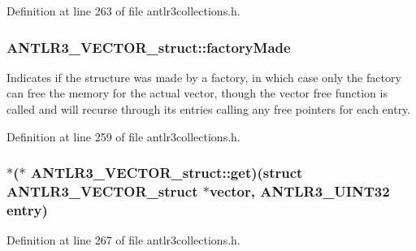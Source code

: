 Definition at line 263 of file antlr3collections.\-h.

\hypertarget{struct_a_n_t_l_r3___v_e_c_t_o_r__struct_a7dabfe6d9965de22b4c2a8ab57c4bdde}{
\subsubsection[{factory\-Made}]{ A\-N\-T\-L\-R3\-\_\-\-V\-E\-C\-T\-O\-R\-\_\-struct\-::factory\-Made}}\label{struct_a_n_t_l_r3___v_e_c_t_o_r__struct_a7dabfe6d9965de22b4c2a8ab57c4bdde}
Indicates if the structure was made by a factory, in which case only the factory can free the memory for the actual vector, though the vector free function is called and will recurse through its entries calling any free pointers for each entry. 

Definition at line 259 of file antlr3collections.\-h.

\hypertarget{struct_a_n_t_l_r3___v_e_c_t_o_r__struct_a784acc56b2e82f3076691f7b1b28e279}{
\subsubsection[{get}]{$\ast$($\ast$ A\-N\-T\-L\-R3\-\_\-\-V\-E\-C\-T\-O\-R\-\_\-struct\-::get)(struct {\bf A\-N\-T\-L\-R3\-\_\-\-V\-E\-C\-T\-O\-R\-\_\-struct} $\ast${\bf vector}, {\bf A\-N\-T\-L\-R3\-\_\-\-U\-I\-N\-T32} entry)}}\label{struct_a_n_t_l_r3___v_e_c_t_o_r__struct_a784acc56b2e82f3076691f7b1b28e279}


Definition at line 267 of file antlr3collections.\-h.

